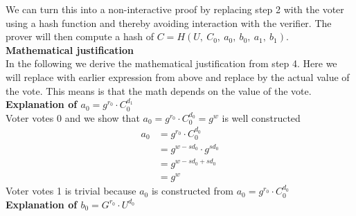 \noindent
We can turn this into a non-interactive proof by replacing step 2 with the voter using a hash function and thereby avoiding interaction with the verifier. The prover will then compute a hash of \begin{math}C=H(U,\ C_0,\ a_0,\ b_0,\ a_1,\ b_1) \end{math}.\\




\noindent
\textbf{Mathematical justification}\\
In the following we derive the mathematical justification from step 4. Here we will replace with earlier expression from above and replace by the actual value of the vote. This means is that the math depends on the value of the vote.\\

\noindent
\textbf{Explanation of \begin{math}a_0=g^{r_0}  \cdot  C^{d_1}_0\end{math}}\\

\noindent
Voter votes 0 and we show that \begin{math}a_0=g^{r_0}  \cdot  C^{d_0}_0 = g^w \end{math} is well constructed
\begin{align*}
    a_0 &=g^{r_0}  \cdot  C^{d_0}_0     \\ 
        &= g^{w-sd_0} \cdot  g^{sd_0}   \\
        &= g^{w-sd_0+ sd_0}             \\
        &= g^w                          
\end{align*}
Voter votes 1 is trivial because \begin{math}a_0 \end{math}  is constructed from \begin{math}a_0=g^{r_0}  \cdot  C^{d_0}_0 \end{math}\\



\noindent
\textbf{Explanation of \begin{math}b_0 = G^{r_0} \cdot U^{d_0}\end{math}}\\

